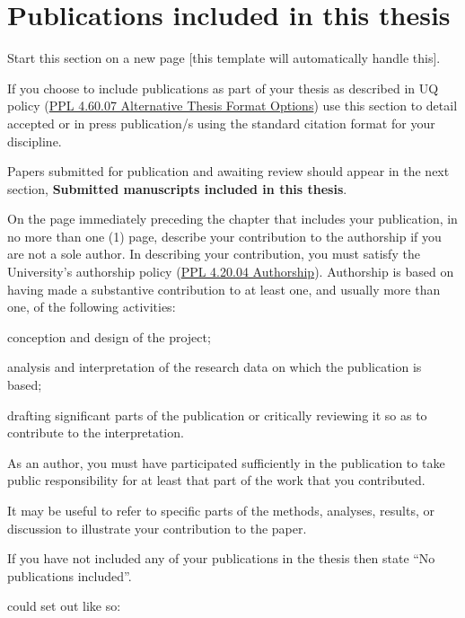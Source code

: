 \section*{Publications included in this thesis}

\begin{instructional}

	Start this section on a new page [this template will automatically handle this].
	
	If you choose to include publications as part of your thesis as described in UQ policy (\href{http://ppl.app.uq.edu.au/content/4.60.07-alternate-thesis-format-options}{PPL 4.60.07 Alternative Thesis Format Options}) use this section to detail accepted or in press publication/s using the standard citation format for your discipline. 

	Papers submitted for publication and awaiting review should appear in the next section, \textbf{Submitted manuscripts included in this thesis}.

	On the page immediately preceding the chapter that includes your publication, in no more than one (1) page, describe your contribution to the authorship if you are not a sole author. In describing your contribution, you must satisfy the University's authorship policy (\href{http://ppl.app.uq.edu.au/content/4.20.04-authorship}{PPL 4.20.04 Authorship}). Authorship is based on having made a substantive contribution to at least one, and usually more than one, of the following activities:
	\begin{itemize*}
		\item	conception and design of the project;
		\item	analysis and interpretation of the research data on which the publication is based;
		\item	drafting significant parts of the publication or critically reviewing it so as to contribute to the interpretation.
	\end{itemize*}
	
	As an author, you must have participated sufficiently in the publication to take public responsibility for at least that part of the work that you contributed.

	It may be useful to refer to specific parts of the methods, analyses, results, or discussion to illustrate your contribution to the paper.

	If you have not included any of your publications in the thesis then state ``No publications included''.
	
	\eg{} could set out like so:
\end{instructional}

